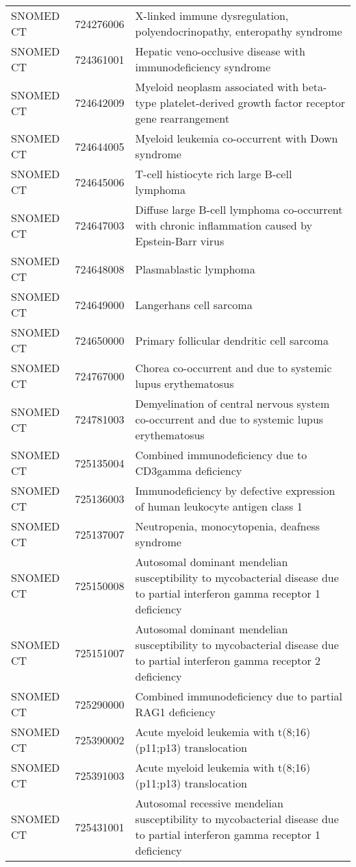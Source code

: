 \begin{longtable}{p{}p{}p{}}
  SNOMED CT & 724276006 & X-linked immune dysregulation, polyendocrinopathy, enteropathy syndrome \\ 
  SNOMED CT & 724361001 & Hepatic veno-occlusive disease with immunodeficiency syndrome \\ 
  SNOMED CT & 724642009 & Myeloid neoplasm associated with beta-type platelet-derived growth factor receptor gene rearrangement \\ 
  SNOMED CT & 724644005 & Myeloid leukemia co-occurrent with Down syndrome \\ 
  SNOMED CT & 724645006 & T-cell histiocyte rich large B-cell lymphoma \\ 
  SNOMED CT & 724647003 & Diffuse large B-cell lymphoma co-occurrent with chronic inflammation caused by Epstein-Barr virus \\ 
  SNOMED CT & 724648008 & Plasmablastic lymphoma \\ 
  SNOMED CT & 724649000 & Langerhans cell sarcoma \\ 
  SNOMED CT & 724650000 & Primary follicular dendritic cell sarcoma \\ 
  SNOMED CT & 724767000 & Chorea co-occurrent and due to systemic lupus erythematosus \\ 
  SNOMED CT & 724781003 & Demyelination of central nervous system co-occurrent and due to systemic lupus erythematosus \\ 
  SNOMED CT & 725135004 & Combined immunodeficiency due to CD3gamma deficiency \\ 
  SNOMED CT & 725136003 & Immunodeficiency by defective expression of human leukocyte antigen class 1 \\ 
  SNOMED CT & 725137007 & Neutropenia, monocytopenia, deafness syndrome \\ 
  SNOMED CT & 725150008 & Autosomal dominant mendelian susceptibility to mycobacterial disease due to partial interferon gamma receptor 1 deficiency \\ 
  SNOMED CT & 725151007 & Autosomal dominant mendelian susceptibility to mycobacterial disease due to partial interferon gamma receptor 2 deficiency \\ 
  SNOMED CT & 725290000 & Combined immunodeficiency due to partial RAG1 deficiency \\ 
  SNOMED CT & 725390002 & Acute myeloid leukemia with t(8;16)(p11;p13) translocation \\ 
  SNOMED CT & 725391003 & Acute myeloid leukemia with t(8;16)(p11;p13) translocation \\ 
  SNOMED CT & 725431001 & Autosomal recessive mendelian susceptibility to mycobacterial disease due to partial interferon gamma receptor 1 deficiency \\ 

\end{longtable}
